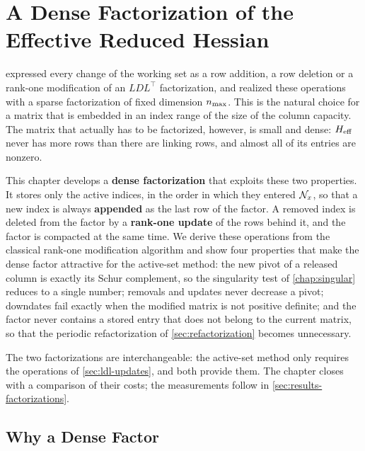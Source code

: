 \chapter{A Dense Factorization of the Effective Reduced Hessian}
\label{chap:dense}

\vspace*{\fill}

 expressed every change of the working set as a row addition, a row
deletion or a rank-one modification of an $LDL^\top$ factorization, and realized these
operations with a sparse factorization of fixed dimension $n_{\max}$. This is the natural choice
for a matrix that is embedded in an index range of the size of the column capacity. The matrix
that actually has to be factorized, however, is small and dense: $H_{\mathrm{eff}}$ never has more rows
than there are linking rows, and almost all of its entries are nonzero.

\medskip

This chapter develops a \textbf{dense factorization} that exploits these two properties. It
stores only the active indices, in the order in which they entered $\mathcal{N}_x$, so that a new index
is always \textbf{appended} as the last row of the factor. A removed index is deleted from the
factor by a \textbf{rank-one update} of the rows behind it, and the factor is compacted at the
same time. We derive these operations from the classical rank-one modification algorithm and
show four properties that make the dense factor attractive for the active-set method: the new
pivot of a released column is exactly its Schur complement, so the singularity test of
\cref{chap:singular} reduces to a single number; removals and updates never decrease a pivot;
downdates fail exactly when the modified matrix is not positive definite; and the factor never
contains a stored entry that does not belong to the current matrix, so that the periodic
refactorization of \cref{sec:refactorization} becomes unnecessary.

\medskip

The two factorizations are interchangeable: the active-set method only requires the
operations of \cref{sec:ldl-updates}, and both provide them. The chapter closes with a
comparison of their costs; the measurements follow in \cref{sec:results-factorizations}.

\vspace*{\fill}

\newpage


\section{Why a Dense Factor}
\label{sec:why-dense}

